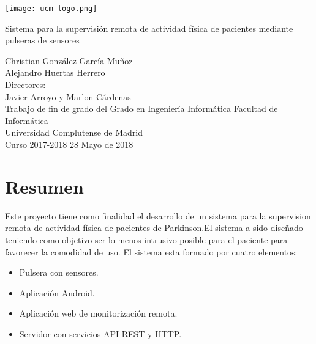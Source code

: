 \documentclass[11pt,spanish]{article}
\author{
\Large Christian González García-Muñoz \\ 
\Large Alejandro Huertas Herrero 
}
\date{}
\begin{document}
\begin{titlepage}
	\centering
    \texttt{[image: ucm-logo.png]}
    \vskip 1cm
    
    \centering
    {\huge Sistema para la supervisión remota de actividad física de pacientes mediante pulseras de sensores 
    }
    \newline
    \newline
    \newline
    \newline
    
	\centering \large { Christian González García-Muñoz \\  Alejandro Huertas Herrero \\ 
    					\bigskip Directores: \\ Javier Arroyo y Marlon Cárdenas \\ \bigskip}
    \vskip 1cm
    \centering \Large { Trabajo de fin de grado del Grado en Ingeniería Informática }
	\vskip 1cm
    \centering \large {Facultad de Informática \\ Universidad Complutense de Madrid \\ Curso 2017-2018}
    \vskip 0.5cm
    \centering \large {28	 Mayo de 2018}

\end{titlepage}
\clearpage
\vphantom{a}
\newpage


\section*{Resumen}

Este proyecto tiene como finalidad el desarrollo de un sistema para la supervision remota de actividad física de pacientes de Parkinson.El sistema a sido diseñado teniendo como objetivo ser lo menos intrusivo posible para el paciente para favorecer la comodidad de uso. El sistema esta formado por cuatro elementos:

\begin{itemize}
    \item Pulsera con sensores. 
	\item Aplicación Android. 
	\item Aplicación web de monitorización remota.
    \item Servidor con servicios API REST y HTTP.
    \newline
\end{itemize}
\end{document}
